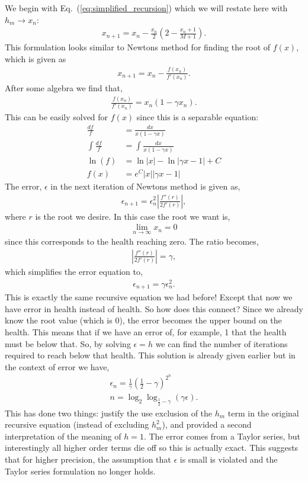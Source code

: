 We begin with Eq.~(\ref{eq:simplified_recursion}) which we will restate here with $h_m\to x_n$:
\begin{align}
	x_{n+1} = x_n - \frac{x_n}{2}\left(2 - \frac{x_n + 1}{M+1} \right).
\end{align}
This formulation looks similar to Newtons method for finding the root of $f(x)$, which is given as
\begin{align}
	x_{n+1} = x_n - \frac{f(x_n)}{f'(x_n)}.
\end{align}
After some algebra we find that,
\begin{align}
	\frac{f(x_n)}{f'(x_n)} = x_n(1-\gamma x_n).
\end{align}
This can be easily solved for $f(x)$ since this is a separable equation:
\begin{align}
	\frac{df}{f} &= \frac{dx}{x(1-\gamma x)} \\
	\int \frac{df}{f} &= \int \frac{dx}{x(1-\gamma x)} \\
	\ln(f) &= \ln|x| - \ln|\gamma x - 1| + C \\
	f(x) &= e^C |x||\gamma x - 1|
\end{align}
The error, $\epsilon$ in the next iteration of Newtons method is given as,
\begin{align}
	\epsilon_{n+1} = \epsilon_{n}^2 \left | \frac{f''(r)}{2f'(r)} \right |,
\end{align}
where $r$ is the root we desire. In this case the root we want is,
\begin{align}
	\lim_{n\to\infty} x_n = 0
\end{align}
since this corresponds to the health reaching zero. The ratio becomes,
\begin{align}
	\left| \frac{f''(r)}{2f'(r)} \right| = \gamma,
\end{align}
which simplifies the error equation to,
\begin{align}
	\epsilon_{n+1} = \gamma \epsilon_{n}^2.
\end{align}
This is exactly the same recursive equation we had before! Except that now we have error in health instead of health. So how does this connect? Since we already know the root value (which is 0), the error becomes the upper bound on the health. This means that if we have an error of, for example, 1 that the health must be below that. So, by solving $\epsilon=h$ we can find the number of iterations required to reach below that health. This solution is already given earlier but in the context of error we have,
\begin{align}
	\epsilon_{n} = \frac{1}{\gamma}\left( \frac{1}{2} - \gamma \right)^{2^{n}} \\
	n = \log_2 \log_{\frac{1}{2} - \gamma} (\gamma \epsilon).
\end{align}
This has done two things: justify the use exclusion of the $h_m$ term in the original recursive equation (instead of excluding $h^2_m$), and provided a second interpretation of the meaning of $h = 1$. The error comes from a Taylor series, but interestingly all higher order terms die off so this is actually exact. This suggests that for higher precision, the assumption that $\epsilon$ is small is violated and the Taylor series formulation no longer holds.
